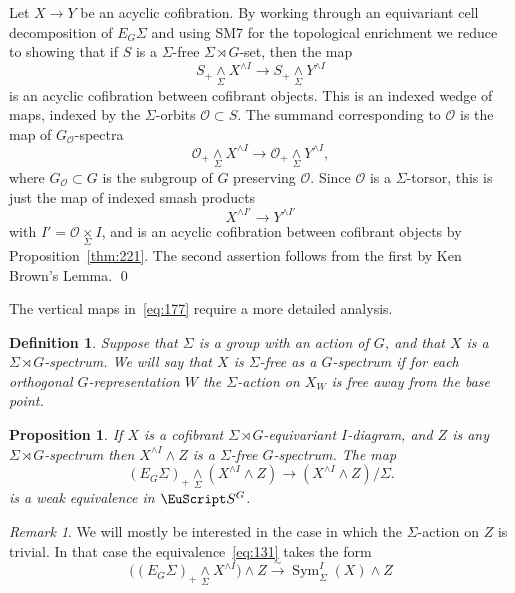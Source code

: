 \documentclass{amsart}
\newtheorem{prop}[equation]{Proposition}
\newtheorem{definition}[equation]{Definition}
\newenvironment{defin}{\begin{definition}\rm}{\end{definition}}
\newtheorem{rem}[equation]{Remark}
\theoremstyle{definition}
\newtheorem{defin}[equation]{Definition}
\theoremstyle{remark}
\newtheorem{rem}[equation]{Remark}
\newenvironment{pf}{\bigskip{\em Proof:\/}}{\qed\medskip}
\DeclareMathOperator{\sym}{Sym}
\newcommand{\spectra}{\EuScript S}
\newcommand{\smashove}[1]{\underset{#1}{\wedge}}
\newcommand{\ugspectra}[1]{\spectra^{#1}}
\newcommand{\eggroup}[2]{E_{#1}#2}
\newcommand{\egsigma}[1]{\eggroup{#1}{\Sigma}}
\begin{document}
\begin{pf}
Let $X\to Y$ be an acyclic cofibration.  By working through an
equivariant cell decomposition of $\egsigma{G}$ and using SM7 for the
topological enrichment we reduce to showing that if $S$ is a
$\Sigma$-free $\Sigma\rtimes G$-set, then the map
\[
S_{+}\smashove{\Sigma}X^{\wedge I} \to
S_{+}\smashove{\Sigma}Y^{\wedge I} 
\]
is an acyclic cofibration between cofibrant objects.  This is an
indexed wedge of maps, indexed by the $\Sigma$-orbits $\mathcal
O\subset S$.  The summand corresponding to $\mathcal O$ is the map of
$G_{\mathcal O}$-spectra
\[
\mathcal O_{+}\smashove{\Sigma}X^{\wedge I}\to
\mathcal O_{+}\smashove{\Sigma}Y^{\wedge I},
\]
where $G_{\mathcal O}\subset G$ is the subgroup of $G$ preserving
$\mathcal O$.  Since $\mathcal O$ is a $\Sigma$-torsor, this is just 
the map of indexed smash products 
\[
X^{\wedge I'}  \to Y^{\wedge I'} 
\]
with $I' = \mathcal O\underset{\Sigma}{\times}I$, and is an acyclic
cofibration between cofibrant objects by Proposition~\ref{thm:221}.
The second assertion follows from the first by Ken Brown's Lemma.
\end{pf}

The vertical maps in~\eqref{eq:177} require a more detailed analysis.


\begin{defin}
\label{def:47} Suppose that $\Sigma$ is a group with an action of $G$,
and that $X$ is a $\Sigma\rtimes G$-spectrum.  We will say that $X$ is
{\em $\Sigma$-free as a $G$-spectrum} if for each orthogonal
$G$-representation $W$ the $\Sigma$-action on $X_{W}$ is free away
from the base point.
\end{defin}

\begin{prop}
\label{thm:200} If $X$ is a cofibrant $\Sigma\rtimes G$-equivariant
$I$-diagram, and $Z$ is any $\Sigma\rtimes G$-spectrum then $X^{\wedge
I}\wedge Z$ is a $\Sigma$-free $G$-spectrum.  The map
\begin{equation}
\label{eq:131}
(\egsigma{G})_{+}\smashove{\Sigma} (X^{\wedge I}\wedge Z)\to
(X^{\wedge I}\wedge Z)/\Sigma.
\end{equation}
is a weak equivalence in $\ugspectra{G}$.
\end{prop}

\begin{rem}
\label{rem:64}
We will mostly be interested in the case in which the $\Sigma$-action
on $Z$ is trivial.   In that case the equivalence~\eqref{eq:131}
takes the form
\[
\big((\egsigma{G})_{+}\smashove{\Sigma} X^{\wedge I}\big)\wedge Z\xrightarrow{\sim}{}
\sym^{I}_{\Sigma}(X)\wedge Z
\]
\end{rem}
\end{document}
